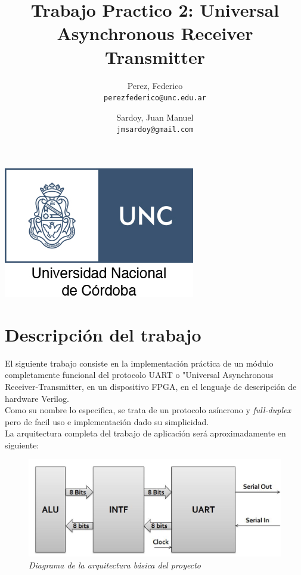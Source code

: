 \documentclass{article}
\title{Trabajo Practico 2: Universal Asynchronous Receiver Transmitter}
\author{Perez, Federico\\
        \texttt{perezfederico@unc.edu.ar}
        \and 
        Sardoy, Juan Manuel\\
        \texttt{jmsardoy@gmail.com}
        }
\begin{document}
\maketitle	
\begin{center}
    \includegraphics[scale=2]{unc-logo}
\end{center}
\newpage
\section{Descripción del trabajo}

El siguiente trabajo consiste en la implementación práctica de un módulo completamente
funcional del protocolo UART o "Universal Asynchronous Receiver-Transmitter, en un dispositivo FPGA,
en el lenguaje de descripción de hardware Verilog. \\
Como su nombre lo especifica, se trata de un protocolo asíncrono y \textit{full-duplex}
pero de facil uso e implementación dado su simplicidad.\\
La arquitectura completa del trabajo de aplicación será aproximadamente en siguiente:

\begin{figure}[H]
    \includegraphics[scale=0.5]{arch}
    \caption{\textit{Diagrama de la arquitectura básica del proyecto}}
\end{figure}
\end{document}

